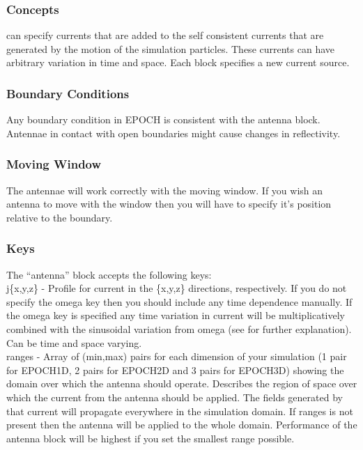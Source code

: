 \subsubsection{Concepts}

{\EPOCH} can specify currents that are added to the self consistent currents
that are generated by the motion of the simulation particles. These currents
can have arbitrary variation in time and space. Each  block
specifies a new current source.

\subsubsection{Boundary Conditions}

Any boundary condition in EPOCH is consistent with the antenna block. Antennae
in contact with open boundaries might cause changes in reflectivity.

\subsubsection{Moving Window}

The antennae will work correctly with the moving window. If you wish an antenna
to move with the window then you will have to specify it's position relative to
the  boundary.

\subsubsection{Keys}

The ``antenna'' block accepts the following keys:\\

{\emphtext j\{x,y,z\}} -  Profile for current in the \{x,y,z\} directions,
  respectively. If you do not specify the omega key then you should include any
  time dependence manually. If the omega key is specified any time variation in
  current will be multiplicatively combined with the sinusoidal variation from
  omega (see  for further explanation). Can be time and
  space varying.\\

{\emphtext ranges} - Array of (min,max) pairs for each dimension of your
  simulation (1 pair for EPOCH1D, 2 pairs for EPOCH2D and 3 pairs for EPOCH3D)
  showing the domain over which the antenna should operate. Describes the region
  of space over which the current from the antenna should be applied. The fields
  generated by that current will propagate everywhere in the simulation domain.
  If ranges is not present then the antenna will be applied to the whole domain.
  Performance of the antenna block will be highest if you set the smallest range
  possible.\\


